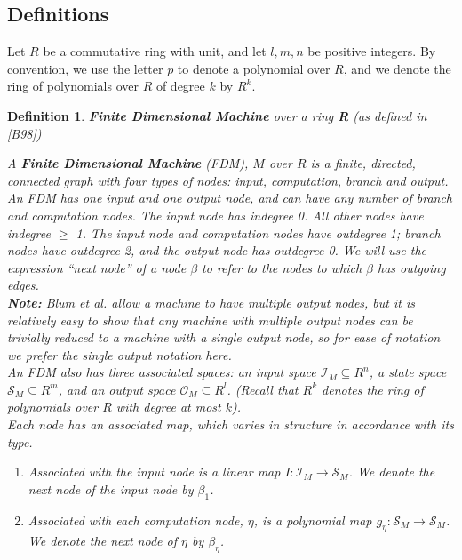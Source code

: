 \documentclass[twoside]{article}
\newcommand{\inspace}[0]{\mathcal{I}}
\newcommand{\outspace}[0]{\mathcal{O}}
\newcommand{\statespace}[0]{\mathcal{S}}
\newcommand{\functype}[3]{$#1:#2 \rightarrow #3$}
\newcommand{\note}[1]{{\textbf{Note:} #1}}
\renewcommand{\cite}[1]{[#1]}
\newtheorem{definition}[theorem]{Definition}
\begin{document}
\subsection{Definitions}

Let $R$ be a commutative ring with unit, and let $l, m, n$ be positive
integers.  By convention, we use the letter $p$ to denote a polynomial
over $R$, and we denote the ring of polynomials over $R$ of degree $k$
by $R^k$. 

\begin{definition}{\textbf{Finite Dimensional Machine} over a ring
    \textbf{R} (as defined in \cite{B98})}

  A \textbf{Finite Dimensional Machine} (FDM), $M$ over $R$ is a
  finite, directed, connected graph with four types of nodes:
  \emph{input, computation, branch} and \emph{output}.  An FDM has one
  input and one output node, and can have any number of branch and
  computation nodes. The input node has indegree 0.  All other nodes
  have indegree $\geq$ 1. The input node and computation nodes have
  outdegree 1; branch nodes have outdegree 2, and the output node has
  outdegree 0.  We will use the expression ``next node'' of a node
  $\beta$ to refer to the nodes to which $\beta$ has outgoing edges.\\

  \emph{\note{Blum et al. allow a machine to have multiple
    output nodes, but it is relatively easy to show that any machine
    with multiple output nodes can be trivially reduced to a machine
    with a single output node, so for ease of notation we
    prefer the single output notation here.}}\\

  An FDM also has three associated spaces: an input space $\inspace_M
  \subseteq R^n$, a state space $\statespace_M \subseteq R^m$, and an
  output space $\outspace_M \subseteq R^l$.  (Recall that $R^k$
  denotes the ring of polynomials over $R$ with degree at most $k$).\\

  Each node has an associated map, which varies in structure in
  accordance with its type.
  \begin{enumerate}
  \item Associated with the input node is a linear map
    \functype{I}{\inspace_M}{\statespace_M}. We denote the next node
    of the input node by $\beta_1$.

  \item Associated with each computation node, $\eta$, is a polynomial
    map \functype{g_\eta}{\statespace_M}{\statespace_M}. We denote the
    next node of $\eta$ by $\beta_\eta$.


\end{enumerate}
\end{definition}
\end{document}
